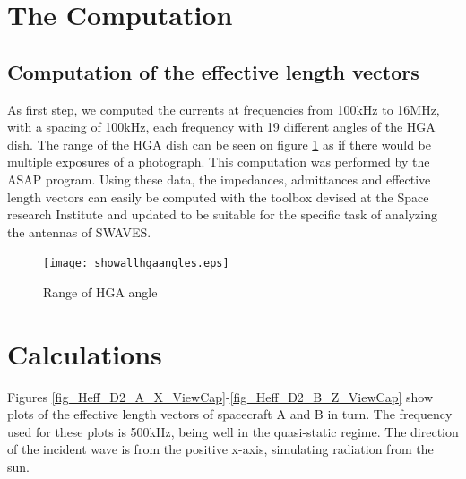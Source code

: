 \documentclass[a4paper,14pt]{extbook}
\begin{document}
\section{The Computation}

\subsection{Computation of the effective length vectors}

As first step, we computed the currents at frequencies from 100kHz
to 16MHz, with a spacing of 100kHz, each frequency with 19 different angles of the HGA dish. The range of the HGA dish can be seen on figure \ref{fig_hgarange} as if there would be multiple exposures of a photograph. This computation was performed by the ASAP program. Using these data, the impedances, admittances and effective length vectors can easily be computed with the
toolbox devised at the Space research Institute and updated to be suitable for the specific task of analyzing the antennas of SWAVES.\\

\begin{figure}
\begin{center}
  \texttt{[image: showallhgaangles.eps]}\\
  \caption{Range of HGA angle}\label{fig_hgarange}
\end{center}
\end{figure}

\section{Calculations}
Figures \ref{fig_Heff_D2_A_X_ViewCap}-\ref{fig_Heff_D2_B_Z_ViewCap} show plots of the effective length vectors of spacecraft A and B in turn. The frequency used for these plots is 500kHz, being well in the quasi-static regime. The direction of the incident wave is from the positive x-axis, simulating radiation from the sun.\\
\end{document}
